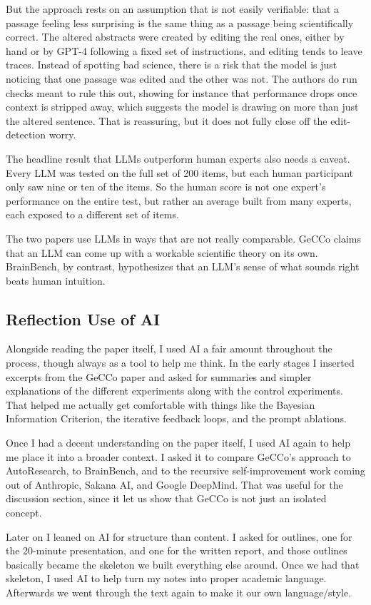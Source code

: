 But the approach rests on an assumption that is not easily verifiable: that a passage feeling less surprising is the same thing as a passage being scientifically correct. The altered abstracts were created by editing the real ones, either by hand or by GPT-4 following a fixed set of instructions, and editing tends to leave traces. Instead of spotting bad science, there is a risk that the model is just noticing that one passage was edited and the other was not. The authors do run checks meant to rule this out, showing for instance that performance drops once context is stripped away, which suggests the model is drawing on more than just the altered sentence. That is reassuring, but it does not fully close off the edit-detection worry.
 
The headline result that LLMs outperform human experts also needs a caveat. Every LLM was tested on the full set of 200 items, but each human participant only saw nine or ten of the items. So the human score is not one expert's performance on the entire test, but rather an average built from many experts, each exposed to a different set of items.
 
The two papers use LLMs in ways that are not really comparable. GeCCo claims that an LLM can come up with a workable scientific theory on its own. BrainBench, by contrast, hypothesizes that an LLM's sense of what sounds right beats human intuition.
\subsection{Reflection Use of AI}

Alongside reading the paper itself, I used AI a fair amount throughout the process, though always as a tool to help me think. In the early stages I inserted excerpts from the GeCCo paper and asked for summaries and simpler explanations of the different experiments along with the control experiments. That  helped me actually get comfortable with things like the Bayesian Information Criterion, the iterative feedback loops, and the prompt ablations.
 
Once I had a decent understanding on the paper itself, I used AI again to help me place it into a broader context. I asked it to compare GeCCo's approach to AutoResearch, to BrainBench, and to the recursive self-improvement work coming out of Anthropic, Sakana AI, and Google DeepMind. That was useful for the discussion section, since it let us show that GeCCo is not just an isolated concept.
 
Later on I leaned on AI for structure than content. I asked for outlines, one for the 20-minute presentation, and one for the written report, and those outlines basically became the skeleton we built everything else around. Once we had that skeleton, I used AI to help turn my notes into proper academic language. Afterwards we went through the text again to make it our own language/style.
